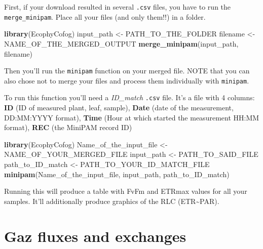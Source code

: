 \documentclass[
  12pt,
  american,
  a4paper,
  extrafontsizes,onecolumn,openright
  ]{memoir}
\newenvironment{Shaded}{\begin{snugshade}}{\end{snugshade}}
\newcommand{\KeywordTok}[1]{\textcolor[rgb]{0.13,0.29,0.53}{\textbf{#1}}}
\newcommand{\NormalTok}[1]{#1}
\newcommand{\StringTok}[1]{\textcolor[rgb]{0.31,0.60,0.02}{#1}}
\begin{document}
First, if your download resulted in several \texttt{.csv} files, you have to run the \texttt{merge\_minipam}.
Place all your files (and only them!!) in a folder.

\scriptsize

\begin{Shaded}
\begin{Highlighting}[]
\KeywordTok{library}\NormalTok{(EcophyCofog)}
\NormalTok{input_path <-}\StringTok{ }\NormalTok{PATH_TO_THE_FOLDER}
\NormalTok{filename <-}\StringTok{ }\NormalTok{NAME_OF_THE_MERGED_OUTPUT}
\KeywordTok{merge_minipam}\NormalTok{(input_path, filename)}
\end{Highlighting}
\end{Shaded}

\normalsize

Then you'll run the \texttt{minipam} function on your merged file.
NOTE that you can also chose not to merge your files and process them individually with \texttt{minipam}.

To run this function you'll need a \emph{ID\_match} \texttt{.csv} file.
It's a file with 4 columns: \textbf{ID} (ID of measured plant, leaf, sample), \textbf{Date} (date of the measurement, DD:MM:YYYY format), \textbf{Time} (Hour at which started the measurement HH:MM format), \textbf{REC} (the MiniPAM record ID)

\scriptsize

\begin{Shaded}
\begin{Highlighting}[]
\KeywordTok{library}\NormalTok{(EcophyCofog)}
\NormalTok{Name_of_the_input_file <-}\StringTok{ }\NormalTok{NAME_OF_YOUR_MERGED_FILE}
\NormalTok{input_path <-}\StringTok{ }\NormalTok{PATH_TO_SAID_FILE}
\NormalTok{path_to_ID_match <-}\StringTok{ }\NormalTok{PATH_TO_YOUR_ID_MATCH_FILE}
\KeywordTok{minipam}\NormalTok{(Name_of_the_input_file, input_path, path_to_ID_match)}
\end{Highlighting}
\end{Shaded}

\normalsize

Running this will produce a table with FvFm and ETRmax values for all your samples.
It'll additionally produce graphics of the RLC (ETR\textasciitilde PAR).

\hypertarget{gaz-fluxes-and-exchanges}{%
\chapter{Gaz fluxes and exchanges}\label{gaz-fluxes-and-exchanges}}
\end{document}
